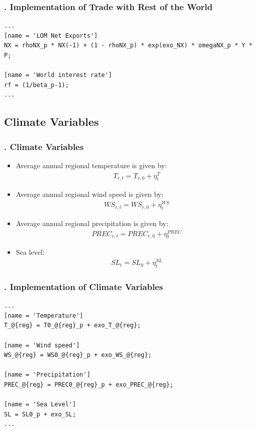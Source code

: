 \documentclass[11pt,aspectratio=169]{beamer}
\begin{document}
\begin{frame}[fragile]
\frametitle{{\thesection.\thesubsection} Implementation of Trade with Rest of the World}

\begin{lstlisting}[frame = single]
...
[name = 'LOM Net Exports']
NX = rhoNX_p * NX(-1) + (1 - rhoNX_p) * exp(exo_NX) * omegaNX_p * Y * P;

[name = 'World interest rate']
rf = (1/beta_p-1);
...
\end{lstlisting}
\end{frame}

\subsection{Climate Variables}

\begin{frame}
\frametitle{{\thesection.\thesubsection} Climate Variables}
\scriptsize
\begin{itemize}
\item Average annual regional temperature is given by:
\begin{align*}
T_{r,t} = T_{r,0} + \eta^{T}_{t}
\end{align*}
\item Average annual regional wind speed is given by:
\begin{align*}
WS_{r,t} = WS_{r,0} + \eta^{WS}_{t}
\end{align*}
\item Average annual regional precipitation is given by:
\begin{align*}
PREC_{r,t} = PREC_{r,0} + \eta^{PREC}_{t}
\end{align*}

\item Sea level:
\begin{align*}
SL_{t} = SL_{0} + \eta^{SL}_{t}
\end{align*}
\end{itemize}
\end{frame}

\begin{frame}[fragile]
\frametitle{{\thesection.\thesubsection} Implementation of Climate Variables}

\begin{lstlisting}[frame = single]
...
[name = 'Temperature']
T_@{reg} = T0_@{reg}_p + exo_T_@{reg};

[name = 'Wind speed']
WS_@{reg} = WS0_@{reg}_p + exo_WS_@{reg};

[name = 'Precipitation']
PREC_@{reg} = PREC0_@{reg}_p + exo_PREC_@{reg};

[name = 'Sea Level']
SL = SL0_p + exo_SL;
...
\end{lstlisting}
\end{frame}
\end{document}
